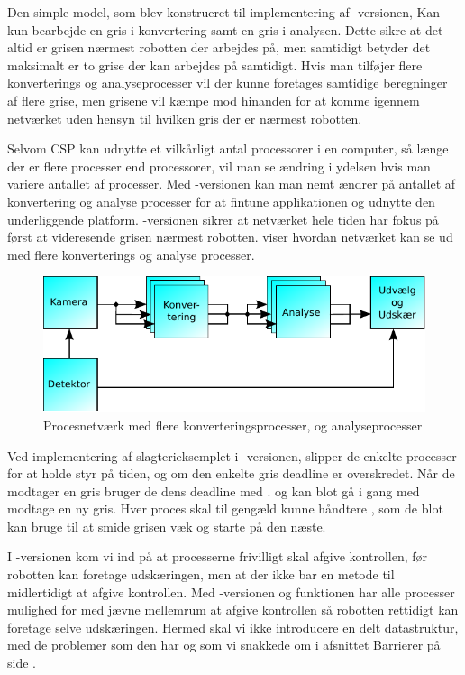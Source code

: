 Den simple model, som blev konstrueret til implementering af -versionen, Kan kun bearbejde en gris i konvertering samt en gris i analysen. Dette sikre at det altid er grisen nærmest robotten der arbejdes på, men samtidigt betyder det maksimalt er  to grise der kan arbejdes på samtidigt. Hvis man 
 tilføjer flere konverterings og analyseprocesser vil der kunne foretages samtidige beregninger af flere grise, men grisene vil kæmpe mod hinanden for at komme igennem netværket uden hensyn til hvilken gris der er nærmest robotten.

Selvom CSP kan udnytte et vilkårligt antal processorer i en computer, så længe der er flere processer end processorer, vil man se ændring i ydelsen hvis man variere  antallet af processer. Med -versionen kan man nemt ændrer på antallet af konvertering og analyse processer for at fintune applikationen og  udnytte den underliggende platform. -versionen sikrer at netværket hele tiden har fokus på først at videresende grisen nærmest robotten.  viser hvordan netværket kan se ud med flere konverterings og analyse processer. 

\begin{figure}
 \begin{center}
  \includegraphics[scale=1]{images/pig-network3}
	\caption{Procesnetværk med flere konverteringsprocesser, og analyseprocesser}
	\label{fig:pig-network3}
\end{center}
\end{figure}

Ved implementering af slagterieksemplet i -versionen, slipper de enkelte processer for at holde styr på tiden, og om den enkelte gris deadline er overskredet. Når de modtager en gris bruger de dens deadline med . og kan blot gå i gang med modtage en ny gris. Hver proces skal til gengæld kunne håndtere  , som de blot kan bruge til at smide grisen væk og starte på den næste.

I -versionen kom vi ind på at processerne frivilligt skal afgive kontrollen, før robotten kan foretage udskæringen, men at der ikke bar en metode til midlertidigt at afgive kontrollen. Med -versionen og funktionen  har alle processer mulighed for med jævne mellemrum at afgive kontrollen så robotten rettidigt kan foretage selve udskæringen. Hermed skal vi ikke  introducere en delt datastruktur, med de problemer som den har og som vi snakkede om i afsnittet Barrierer på side \pageref{sec:barrierer}.
  
